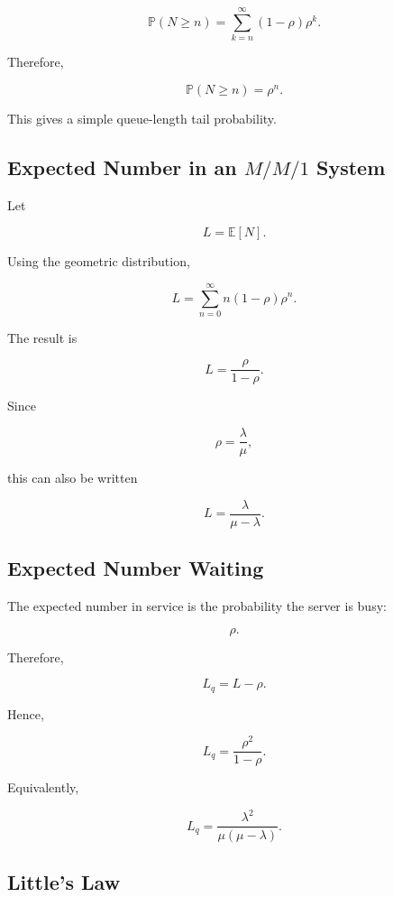 \[
\mathbb{P}(N\geq n)
=
\sum_{k=n}^{\infty}
(1-\rho)\rho^k.
\]

Therefore,

\[
\boxed{
\mathbb{P}(N\geq n)
=
\rho^n.
}
\]

This gives a simple queue-length tail probability.

\subsection{Expected Number in an \(M/M/1\) System}
\label{subsec:mm1-L}

Let

\[
L
=
\mathbb{E}[N].
\]

Using the geometric distribution,

\[
L
=
\sum_{n=0}^{\infty}
n(1-\rho)\rho^n.
\]

The result is

\[
\boxed{
L
=
\frac{\rho}{1-\rho}.
}
\]

Since

\[
\rho
=
\frac{\lambda}{\mu},
\]

this can also be written

\[
\boxed{
L
=
\frac{\lambda}{\mu-\lambda}.
}
\]

\subsection{Expected Number Waiting}
\label{subsec:mm1-Lq}

The expected number in service is the probability the server is busy:

\[
\boxed{
\rho.
}
\]

Therefore,

\[
L_q
=
L-\rho.
\]

Hence,

\[
\boxed{
L_q
=
\frac{\rho^2}{1-\rho}.
}
\]

Equivalently,

\[
\boxed{
L_q
=
\frac{\lambda^2}{
\mu(\mu-\lambda)
}.
}
\]

\subsection{Little's Law}
\label{subsec:littles-law}

